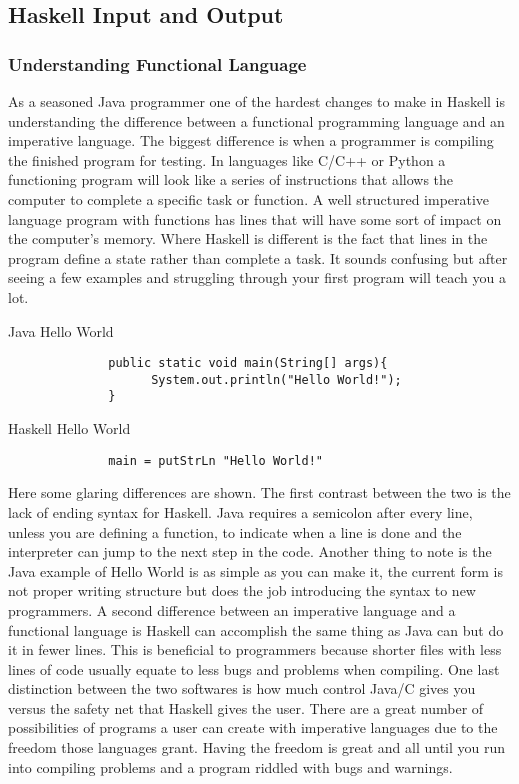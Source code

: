 \documentclass{article}
\begin{document}
\subsection{Haskell Input and Output}
    \subsubsection{Understanding Functional Language}
    As a seasoned Java programmer one of the hardest changes to make in Haskell is understanding the difference between a functional programming language and an imperative language. The biggest difference is when a programmer is compiling the finished program for testing. In languages like C/C++ or Python a functioning program will look like a series of instructions that allows the computer to complete a specific task or function. A well structured imperative language program with functions has lines that will have some sort of impact on the computer's memory. Where Haskell is different is the fact that lines in the program define a state rather than complete a task. It sounds confusing but after seeing a few examples and struggling through your first program will teach you a lot. 
    
    \clearpage
    \caption{Java Hello World}
    \begin{lstlisting}
              public static void main(String[] args){
                    System.out.println("Hello World!");
              }
    \end{lstlisting}
    
    \medskip
    \caption{Haskell Hello World}
    \begin{lstlisting}
              main = putStrLn "Hello World!"
    \end{lstlisting}
    
    \medskip
    Here some glaring differences are shown. The first contrast between the two is the lack of ending syntax for Haskell. Java requires a semicolon after every line, unless you are defining a function, to indicate when a line is done and the interpreter can jump to the next step in the code. Another thing to note is the Java example of Hello World is as simple as you can make it, the current form is not proper writing structure but does the job introducing the syntax to new programmers. A second difference between an imperative language and a functional language is Haskell can accomplish the same thing as Java can but do it in fewer lines. This is beneficial to programmers because shorter files with less lines of code usually equate to less bugs and problems when compiling. One last distinction between the two softwares is how much control Java/C gives you versus the safety net that Haskell gives the user. There are a great number of possibilities of programs a user can create with imperative languages due to the freedom those languages grant. Having the freedom is great and all until you run into compiling problems and a program riddled with bugs and warnings. 
    
\end{document}
